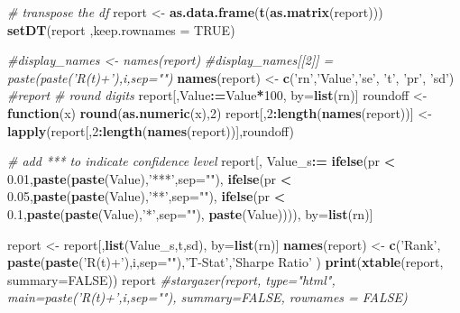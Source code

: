 \documentclass[
]{article}
\newenvironment{Shaded}{\begin{snugshade}}{\end{snugshade}}
\newcommand{\CommentTok}[1]{\textcolor[rgb]{0.56,0.35,0.01}{\textit{#1}}}
\newcommand{\ControlFlowTok}[1]{\textcolor[rgb]{0.13,0.29,0.53}{\textbf{#1}}}
\newcommand{\DataTypeTok}[1]{\textcolor[rgb]{0.13,0.29,0.53}{#1}}
\newcommand{\DecValTok}[1]{\textcolor[rgb]{0.00,0.00,0.81}{#1}}
\newcommand{\ErrorTok}[1]{\textcolor[rgb]{0.64,0.00,0.00}{\textbf{#1}}}
\newcommand{\FloatTok}[1]{\textcolor[rgb]{0.00,0.00,0.81}{#1}}
\newcommand{\KeywordTok}[1]{\textcolor[rgb]{0.13,0.29,0.53}{\textbf{#1}}}
\newcommand{\NormalTok}[1]{#1}
\newcommand{\OperatorTok}[1]{\textcolor[rgb]{0.81,0.36,0.00}{\textbf{#1}}}
\newcommand{\OtherTok}[1]{\textcolor[rgb]{0.56,0.35,0.01}{#1}}
\newcommand{\StringTok}[1]{\textcolor[rgb]{0.31,0.60,0.02}{#1}}
\begin{document}
\begin{Shaded}
\begin{Highlighting}[]
    \CommentTok{# transpose the df}
\NormalTok{    report <-}\StringTok{ }\KeywordTok{as.data.frame}\NormalTok{(}\KeywordTok{t}\NormalTok{(}\KeywordTok{as.matrix}\NormalTok{(report)))}
    \KeywordTok{setDT}\NormalTok{(report ,}\DataTypeTok{keep.rownames =} \OtherTok{TRUE}\NormalTok{)}
    
    \CommentTok{#display_names <- names(report)}
    \CommentTok{#display_names[[2]] = paste(paste('R(t)+'),i,sep="")}
    \KeywordTok{names}\NormalTok{(report) <-}\StringTok{ }\KeywordTok{c}\NormalTok{(}\StringTok{'rn'}\NormalTok{,}\StringTok{'Value'}\NormalTok{,}\StringTok{'se'}\NormalTok{, }\StringTok{'t'}\NormalTok{, }\StringTok{'pr'}\NormalTok{, }\StringTok{'sd'}\NormalTok{)}
    \CommentTok{#report}
    \CommentTok{# round digits}
\NormalTok{    report[,Value}\OperatorTok{:}\ErrorTok{=}\NormalTok{Value}\OperatorTok{*}\DecValTok{100}\NormalTok{, by=}\KeywordTok{list}\NormalTok{(rn)]}
\NormalTok{    roundoff <-}\StringTok{ }\ControlFlowTok{function}\NormalTok{(x) }\KeywordTok{round}\NormalTok{(}\KeywordTok{as.numeric}\NormalTok{(x),}\DecValTok{2}\NormalTok{)}
\NormalTok{    report[,}\DecValTok{2}\OperatorTok{:}\KeywordTok{length}\NormalTok{(}\KeywordTok{names}\NormalTok{(report))] <-}\StringTok{ }\KeywordTok{lapply}\NormalTok{(report[,}\DecValTok{2}\OperatorTok{:}\KeywordTok{length}\NormalTok{(}\KeywordTok{names}\NormalTok{(report))],roundoff)}
    
    \CommentTok{# add *** to indicate confidence level}
\NormalTok{    report[, Value_s}\OperatorTok{:}\ErrorTok{=}\StringTok{ }
\StringTok{             }\KeywordTok{ifelse}\NormalTok{(pr }\OperatorTok{<}\StringTok{ }\FloatTok{0.01}\NormalTok{,}\KeywordTok{paste}\NormalTok{(}\KeywordTok{paste}\NormalTok{(Value),}\StringTok{'***'}\NormalTok{,}\DataTypeTok{sep=}\StringTok{""}\NormalTok{), }
                    \KeywordTok{ifelse}\NormalTok{(pr }\OperatorTok{<}\StringTok{ }\FloatTok{0.05}\NormalTok{,}\KeywordTok{paste}\NormalTok{(}\KeywordTok{paste}\NormalTok{(Value),}\StringTok{'**'}\NormalTok{,}\DataTypeTok{sep=}\StringTok{""}\NormalTok{), }
                           \KeywordTok{ifelse}\NormalTok{(pr }\OperatorTok{<}\StringTok{ }\FloatTok{0.1}\NormalTok{,}\KeywordTok{paste}\NormalTok{(}\KeywordTok{paste}\NormalTok{(Value),}\StringTok{'*'}\NormalTok{,}\DataTypeTok{sep=}\StringTok{""}\NormalTok{), }\KeywordTok{paste}\NormalTok{(Value)))), by=}\KeywordTok{list}\NormalTok{(rn)]}
    
\NormalTok{    report <-}\StringTok{ }\NormalTok{report[,}\KeywordTok{list}\NormalTok{(Value_s,t,sd), by=}\KeywordTok{list}\NormalTok{(rn)]}
    \KeywordTok{names}\NormalTok{(report) <-}\StringTok{ }\KeywordTok{c}\NormalTok{(}\StringTok{'Rank'}\NormalTok{, }\KeywordTok{paste}\NormalTok{(}\KeywordTok{paste}\NormalTok{(}\StringTok{'R(t)+'}\NormalTok{),i,}\DataTypeTok{sep=}\StringTok{""}\NormalTok{),}\StringTok{'T-Stat'}\NormalTok{,}\StringTok{'Sharpe Ratio'}\NormalTok{ )}
    \KeywordTok{print}\NormalTok{(}\KeywordTok{xtable}\NormalTok{(report, }\DataTypeTok{summary=}\OtherTok{FALSE}\NormalTok{))}
\NormalTok{    report}
    \CommentTok{#stargazer(report, type="html", main=paste('R(t)+',i,sep=""), summary=FALSE, rownames = FALSE)}


\end{Highlighting}
\end{Shaded}
\end{document}

